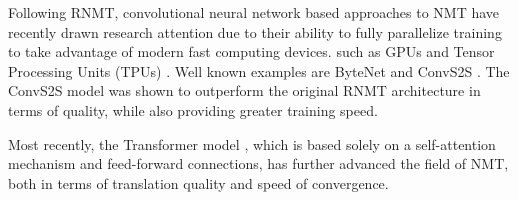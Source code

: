 \documentclass[11pt,a4paper]{article}
\begin{document}

Following RNMT, convolutional neural network based approaches
\cite{LeCun:1998:CNI:303568.303704} to NMT have recently drawn research
attention due to their ability to
fully parallelize training to take advantage of modern fast computing devices.
such as GPUs and Tensor Processing Units (TPUs) \cite{DBLP:journals/corr/JouppiYPPABBBBB17}.
Well known examples are ByteNet
\cite{DBLP:journals/corr/KalchbrennerESO16} and ConvS2S
\cite{DBLP:journals/corr/GehringAGYD17}.
The ConvS2S model was shown to outperform the original RNMT architecture in terms
of quality, while also providing greater training speed.

Most recently, the Transformer model
\cite{DBLP:journals/corr/VaswaniSPUJGKP17}, which is based solely on
a self-attention mechanism \cite{Parikh2016ADA} and feed-forward connections, has further advanced
the field of NMT, both in terms of translation quality and speed of convergence.

\end{document}
